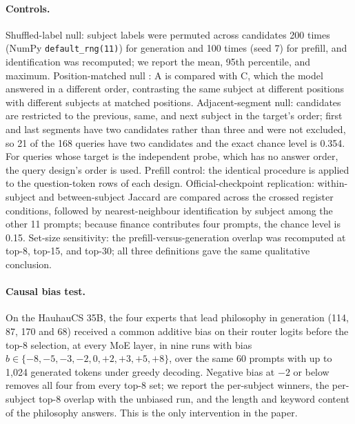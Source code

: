 \documentclass[10pt,twocolumn]{article}
\begin{document}
\paragraph{Controls.} Shuffled-label null: subject labels were permuted across candidates 200 times (NumPy \texttt{default\_rng(11)}) for generation and 100 times (seed 7) for prefill, and identification was recomputed; we report the mean, 95th percentile, and maximum. Position-matched null \citep{shorthill2026entropy}: A is compared with C, which the model answered in a different order, contrasting the same subject at different positions with different subjects at matched positions. Adjacent-segment null: candidates are restricted to the previous, same, and next subject in the target's order; first and last segments have two candidates rather than three and were not excluded, so 21 of the 168 queries have two candidates and the exact chance level is 0.354. For queries whose target is the independent probe, which has no answer order, the query design's order is used. Prefill control: the identical procedure is applied to the question-token rows of each design. Official-checkpoint replication: within-subject and between-subject Jaccard are compared across the crossed register conditions, followed by nearest-neighbour identification by subject among the other 11 prompts; because finance contributes four prompts, the chance level is 0.15. Set-size sensitivity: the prefill-versus-generation overlap was recomputed at top-8, top-15, and top-30; all three definitions gave the same qualitative conclusion.

\paragraph{Causal bias test.} On the HauhauCS 35B, the four experts that lead philosophy in generation (114, 87, 170 and 68) received a common additive bias on their router logits before the top-8 selection, at every MoE layer, in nine runs with bias $b \in \{-8, -5, -3, -2, 0, +2, +3, +5, +8\}$, over the same 60 prompts with up to 1,024 generated tokens under greedy decoding. Negative bias at $-2$ or below removes all four from every top-8 set; we report the per-subject winners, the per-subject top-8 overlap with the unbiased run, and the length and keyword content of the philosophy answers. This is the only intervention in the paper.
\end{document}
